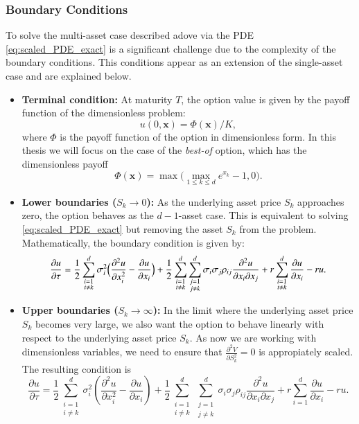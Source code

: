 \documentclass[12pt]{report} %
\theoremstyle{plain} %
\theoremstyle{definition} %
\theoremstyle{remark} %
\begin{document}
\subsubsection{Boundary Conditions}

To solve the multi-asset case described adove via the PDE \eqref{eq:scaled_PDE_exact} is a significant challenge due to the complexity
of the boundary conditions. This conditions appear as an extension of the single-asset case and are explained below.

\begin{itemize}
	\item \textbf{Terminal condition:} At maturity \(T\), the option value is given by the payoff function of the dimensionless problem:
	\[u(0,\mathbf{x}) = \Phi(\mathbf{x})/K,\]	
	where \(\Phi\) is the payoff function of the option in dimensionless form. In this thesis we will focus on the case of the \emph{best-of} option, which has the dimensionless payoff
	\[\Phi(\mathbf{x}) = \max\bigl(\max_{1\le k\le d}e^{x_k}-1,0\bigr).\]
	\item \textbf{Lower boundaries ($S_k \to 0$):} As the underlying asset price \(S_k\) approaches zero, the option behaves as the $d-1$-asset case. This is equivalent to solving \eqref{eq:scaled_PDE_exact} 
	but removing the asset $S_k$ from the problem. Mathematically, the boundary condition is given by:
	\[
		\frac{\partial u}{\partial \tau} =
			\frac12\sum_{\substack{i=1 \\ i\neq k}}^{d}\sigma_i^{2}
				\Bigl(
					\frac{\partial^{2}u}{\partial x_i^{2}}
				- \frac{\partial u}{\partial x_i}
				\Bigr)
		+ \frac12\sum_{\substack{i=1 \\ i\neq k}}^{d}\sum_{\substack{j=1 \\ j\neq k}}^{d}\sigma_i\sigma_j\rho_{ij}
				\frac{\partial^{2}u}{\partial x_i\partial x_j}
		+ r\sum_{\substack{i=1 \\ i\neq k}}^{d}\frac{\partial u}{\partial x_i}
		- ru.
 	\]
	\item \textbf{Upper boundaries ($S_k \to \infty$):} In the limit where the underlying asset price \(S_k\) becomes very large, we also want the option to behave linearly with respect to the underlying asset price $S_k$.
	As now we are working with dimensionless variables, we need to ensure that $\frac{\partial^2 V}{\partial S_k^2} = 0$ is appropiately scaled. The resulting condition is
	\[
		\frac{\partial u}{\partial \tau} =
		\frac{1}{2}\sum_{\substack{i=1 \\ i\neq k}}^d 
		\sigma_i^{2}\left(
		\frac{\partial^{2}u}{\partial x_i^{2}}
		-\frac{\partial u}{\partial x_i}\right)
		+
		\frac{1}{2}\sum_{\substack{i=1 \\ i\neq k}}^d
			\sum_{\substack{j=1 \\ j\neq k}}^d
		\sigma_i\sigma_j\rho_{ij}
		\frac{\partial^{2}u}{\partial x_i\partial x_j}
		+
		r\sum_{i=1}^d\frac{\partial u}{\partial x_i}
		-
		ru.
	\]
\end{itemize}
\end{document}
